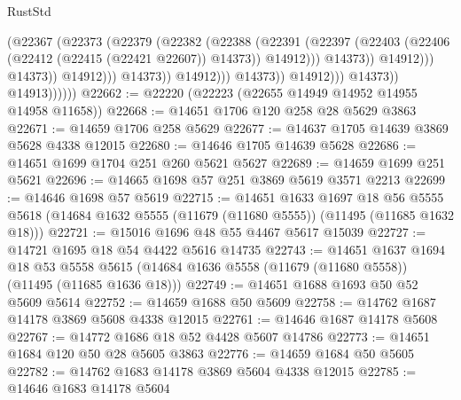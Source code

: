 \begin{lexlean}{RustStd}
\begin{coremodule}
                                                  (@22367
                                                    (@22373
                                                      (@22379
                                                        (@22382
                                                          (@22388
                                                            (@22391
                                                              (@22397
                                                                (@22403
                                                                  (@22406
                                                                    (@22412
                                                                      (@22415 (@22421 @22607))
                                                                      @14373))
                                                                  @14912)))
                                                            @14373))
                                                        @14912)))
                                                  @14373))
                                              @14912)))
                                        @14373))
                                    @14912)))
                              @14373))
                          @14912)))
                    @14373))
                @14913))))))
@22662 := @22220 (@22223 (@22655 @14949 @14952 @14955 @14958 @11658))
@22668 := @14651 @1706 @120 @258 @28 @5629 @3863
@22671 := @14659 @1706 @258 @5629
@22677 := @14637 @1705 @14639 @3869 @5628 @4338 @12015
@22680 := @14646 @1705 @14639 @5628
@22686 := @14651 @1699 @1704 @251 @260 @5621 @5627
@22689 := @14659 @1699 @251 @5621
@22696 := @14665 @1698 @57 @251 @3869 @5619 @3571 @2213
@22699 := @14646 @1698 @57 @5619
@22715 := @14651
    @1633
    @1697
    @18
    @56
    @5555
    @5618
    (@14684 @1632 @5555 (@11679 (@11680 @5555)) (@11495 (@11685 @1632 @18)))
@22721 := @15016 @1696 @48 @55 @4467 @5617 @15039
@22727 := @14721 @1695 @18 @54 @4422 @5616 @14735
@22743 := @14651
    @1637
    @1694
    @18
    @53
    @5558
    @5615
    (@14684 @1636 @5558 (@11679 (@11680 @5558)) (@11495 (@11685 @1636 @18)))
@22749 := @14651 @1688 @1693 @50 @52 @5609 @5614
@22752 := @14659 @1688 @50 @5609
@22758 := @14762 @1687 @14178 @3869 @5608 @4338 @12015
@22761 := @14646 @1687 @14178 @5608
@22767 := @14772 @1686 @18 @52 @4428 @5607 @14786
@22773 := @14651 @1684 @120 @50 @28 @5605 @3863
@22776 := @14659 @1684 @50 @5605
@22782 := @14762 @1683 @14178 @3869 @5604 @4338 @12015
@22785 := @14646 @1683 @14178 @5604

\end{coremodule}
\end{lexlean}
